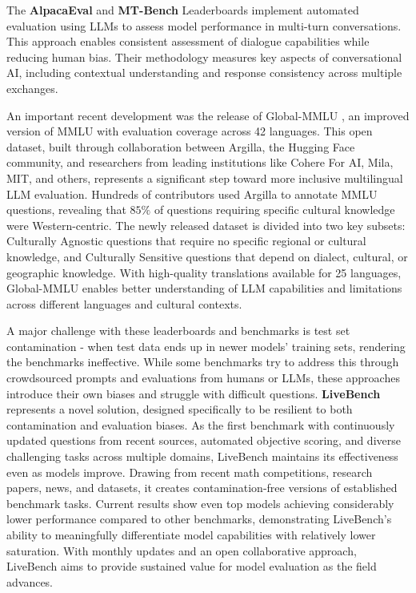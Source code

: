The \textbf{AlpacaEval}  and \textbf{MT-Bench}  Leaderboards implement automated evaluation using LLMs to assess model performance in multi-turn conversations. This approach enables consistent assessment of dialogue capabilities while reducing human bias. Their methodology measures key aspects of conversational AI, including contextual understanding and response consistency across multiple exchanges.

An important recent development was the release of Global-MMLU , an improved version of MMLU with evaluation coverage across 42 languages. This open dataset, built through collaboration between Argilla, the Hugging Face community, and researchers from leading institutions like Cohere For AI, Mila, MIT, and others, represents a significant step toward more inclusive multilingual LLM evaluation. Hundreds of contributors used Argilla to annotate MMLU questions, revealing that $85\%$ of questions requiring specific cultural knowledge were Western-centric. The newly released dataset is divided into two key subsets: Culturally Agnostic questions that require no specific regional or cultural knowledge, and Culturally Sensitive questions that depend on dialect, cultural, or geographic knowledge. With high-quality translations available for 25 languages, Global-MMLU enables better understanding of LLM capabilities and limitations across different languages and cultural contexts.

A major challenge with these leaderboards and benchmarks is test set contamination - when test data ends up in newer models' training sets, rendering the benchmarks ineffective. While some benchmarks try to address this through crowdsourced prompts and evaluations from humans or LLMs, these approaches introduce their own biases and struggle with difficult questions. \textbf{LiveBench}  represents a novel solution, designed specifically to be resilient to both contamination and evaluation biases. As the first benchmark with continuously updated questions from recent sources, automated objective scoring, and diverse challenging tasks across multiple domains, LiveBench maintains its effectiveness even as models improve. Drawing from recent math competitions, research papers, news, and datasets, it creates contamination-free versions of established benchmark tasks. Current results show even top models achieving considerably lower performance compared to other benchmarks, demonstrating LiveBench's ability to meaningfully differentiate model capabilities with relatively lower saturation. With monthly updates and an open collaborative approach, LiveBench aims to provide sustained value for model evaluation as the field advances.

